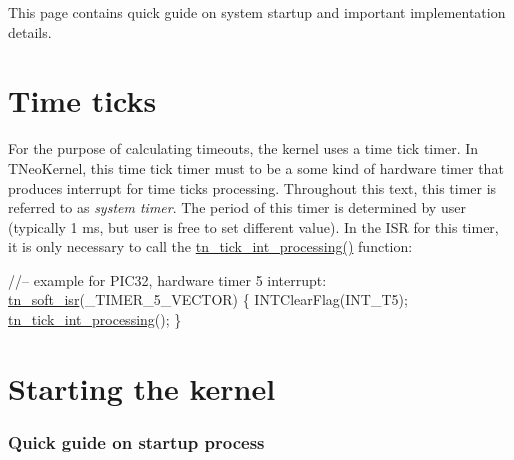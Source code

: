 This page contains quick guide on system startup and important implementation details.\hypertarget{quick_guide_time_ticks}{}\section{Time ticks}\label{quick_guide_time_ticks}
For the purpose of calculating timeouts, the kernel uses a time tick timer. In T\+Neo\+Kernel, this time tick timer must to be a some kind of hardware timer that produces interrupt for time ticks processing. Throughout this text, this timer is referred to as {\itshape system timer}. The period of this timer is determined by user (typically 1 ms, but user is free to set different value). In the I\+S\+R for this timer, it is only necessary to call the {\ttfamily \hyperlink{tn__sys_8h_a944d96c7a5d442d271115b6cb22a085b}{tn\+\_\+tick\+\_\+int\+\_\+processing()}} function\+:


\begin{DoxyCode}
\textcolor{comment}{//-- example for PIC32, hardware timer 5 interrupt:}
\hyperlink{tn__arch__pic32_8h_a46a860d030e59e2c6aa827ca5ad36a37}{tn\_soft\_isr}(\_TIMER\_5\_VECTOR)
\{
   INTClearFlag(INT\_T5);
   \hyperlink{tn__sys_8h_a944d96c7a5d442d271115b6cb22a085b}{tn\_tick\_int\_processing}();
\}
\end{DoxyCode}
\hypertarget{quick_guide_starting_the_kernel}{}\section{Starting the kernel}\label{quick_guide_starting_the_kernel}
\subsubsection*{Quick guide on startup process}


